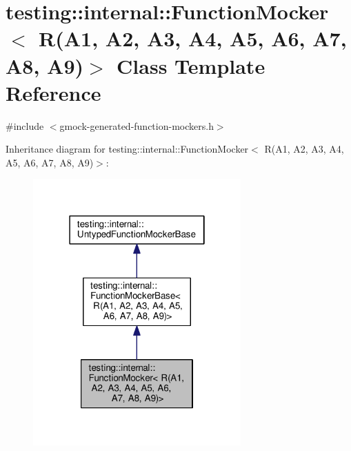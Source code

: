 \hypertarget{classtesting_1_1internal_1_1FunctionMocker_3_01R_07A1_00_01A2_00_01A3_00_01A4_00_01A5_00_01A6_00_01A7_00_01A8_00_01A9_08_4}{}\section{testing\+:\+:internal\+:\+:Function\+Mocker$<$ R(A1, A2, A3, A4, A5, A6, A7, A8, A9)$>$ Class Template Reference}
\label{classtesting_1_1internal_1_1FunctionMocker_3_01R_07A1_00_01A2_00_01A3_00_01A4_00_01A5_00_01A6_00_01A7_00_01A8_00_01A9_08_4}


{\ttfamily \#include $<$gmock-\/generated-\/function-\/mockers.\+h$>$}



Inheritance diagram for testing\+:\+:internal\+:\+:Function\+Mocker$<$ R(A1, A2, A3, A4, A5, A6, A7, A8, A9)$>$\+:
\nopagebreak
\begin{figure}[H]
\begin{center}
\leavevmode
\includegraphics[width=226pt]{classtesting_1_1internal_1_1FunctionMocker_3_01R_07A1_00_01A2_00_01A3_00_01A4_00_01A5_00_01A6_005bd46adfba173c68688094481f4d05d7}
\end{center}
\end{figure}


